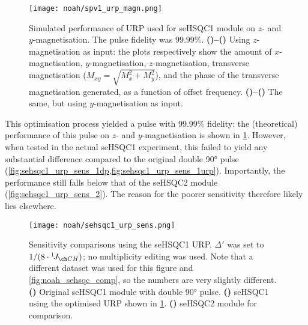 \begin{figure}[!ht]
    \centering
    \texttt{[image: noah/spv1\_urp\_magn.png]}%
    {\label{fig:spv1_urp_magn_z_x}}%
    {\label{fig:spv1_urp_magn_z_y}}%
    {\label{fig:spv1_urp_magn_z_z}}%
    {\label{fig:spv1_urp_magn_z_xy}}%
    {\label{fig:spv1_urp_magn_z_phase}}%
    {\label{fig:spv1_urp_magn_y_x}}%
    {\label{fig:spv1_urp_magn_y_y}}%
    {\label{fig:spv1_urp_magn_y_z}}%
    {\label{fig:spv1_urp_magn_y_xy}}%
    {\label{fig:spv1_urp_magn_y_phase}}%
    \caption[Simulated performance of URP used for seHSQC1 module]{
        Simulated performance of URP used for seHSQC1 module on $z$- and $y$-magnetisation. The pulse fidelity was 99.99\%.
        \textbf{()--()} Using $z$-magnetisation as input: the plots respectively show the amount of $x$-magnetisation, $y$-magnetisation, $z$-magnetisation, transverse magnetisation ($M_{xy} = \sqrt{M_x^2 + M_y^2}$), and the phase of the transverse magnetisation generated, as a function of offset frequency.
        \textbf{()--()} The same, but using $y$-magnetisation as input.
    }
    \label{fig:spv1_urp_magn}
\end{figure}

This optimisation process yielded a pulse with 99.99\% fidelity: the (theoretical) performance of this pulse on $z$- and $y$-magnetisation is shown in \cref{fig:spv1_urp_magn}.
However, when tested in the actual seHSQC1 experiment, this failed to yield any substantial difference compared to the original double \ang{90} pulse (\cref{fig:sehsqc1_urp_sens_1dp,fig:sehsqc1_urp_sens_1urp}).
Importantly, the performance still falls below that of the seHSQC2 module (\cref{fig:sehsqc1_urp_sens_2}).
The reason for the poorer sensitivity therefore likely lies elsewhere.

\begin{figure}[htb]
    \centering
    \texttt{[image: noah/sehsqc1\_urp\_sens.png]}%
    {\label{fig:sehsqc1_urp_sens_1dp}}%
    {\label{fig:sehsqc1_urp_sens_1urp}}%
    {\label{fig:sehsqc1_urp_sens_2}}%
    \caption[Sensitivity comparison of seHSQC1 module with URP]{
        Sensitivity comparisons using the seHSQC1 URP.
        $\Delta'$ was set to $1 / (8 \cdot \oneJ{CH})$; no multiplicity editing was used.
        Note that a different dataset was used for this figure and \cref{fig:noah_sehsqc_comp}, so the numbers are very slightly different.
        \textbf{()} Original seHSQC1 module with double \proton{} \ang{90} pulse.
        \textbf{()} seHSQC1 using the optimised URP shown in \cref{fig:spv1_urp_magn}.
        \textbf{()} seHSQC2 module for comparison.
    }
    \label{fig:sehsqc1_urp_sens}
\end{figure}


